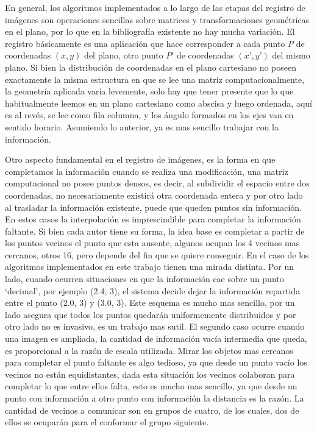 En general,
los algoritmos implementados a lo largo de las etapas del registro de
imágenes son operaciones sencillas sobre matrices y transformaciones
geométricas en el plano, por lo que en la bibliografía existente no
hay mucha variación. El registro básicamente es una aplicación que
hace corresponder a cada punto $P$ de coordenadas $(x,y)$ del plano,
otro punto $P’$ de coordenadas $(x’,y’)$ del mismo plano. Si bien la
distribución de coordenadas en el plano cartesiano no poseen
exactamente la misma estructura en que se lee una matriz
computacionalmente, la geometría aplicada varía levemente, solo hay
que tener presente que lo que habitualmente leemos en un plano
cartesiano como abscisa y luego ordenada, aquí es al revés, se lee
como fila columna, y los ángulo formados en los ejes van en sentido
horario. Asumiendo lo anterior, ya es mas sencillo trabajar con la
información.

Otro aspecto fundamental en el registro de imágenes, es la forma en
que completamos la información cuando se realiza una modificación, una
matriz computacional no posee puntos densos, es decir, al subdividir
el espacio entre dos coordenadas, no necesariamente existirá otra
coordenada entera y por otro lado al trasladar la información
existente, puede que queden puntos sin información. En estos casos la
interpolación es imprescindible para completar la información
faltante. Si bien cada autor tiene su forma, la idea base es completar
a partir de los puntos vecinos el punto que esta ausente, algunos
ocupan los 4 vecinos mas cercanos, otros 16, pero depende del fin que
se quiere conseguir. En el caso de los algoritmos implementados en
este trabajo tienen una mirada distinta. Por un lado, cuando ocurren
situaciones en que la información cae sobre un punto ‘decimal’, por
ejemplo (2.4, 3), el sistema decide dejar la información repartida
entre el punto (2.0, 3) y (3.0, 3). Este esquema es mucho mas
sencillo, por un lado asegura que todos los puntos quedarán
uniformemente distribuidos y por otro lado no es invasivo, es un
trabajo mas sutil. El segundo caso ocurre cuando una imagen es
ampliada, la cantidad de información vacía intermedia que queda, es
proporcional a la razón de escala utilizada. Mirar los objetos mas
cercanos para completar el punto faltante es algo tedioso, ya que
desde un punto vacío los vecinos no están equidistantes, dada esta
situación los vecinos colaboran para completar lo que entre ellos
falta, esto es mucho mas sencillo, ya que desde un punto con
información a otro punto con información la distancia es la razón. La
cantidad de vecinos a comunicar son en grupos de cuatro, de los
cuales, dos de ellos se ocuparán para el conformar el grupo siguiente.

